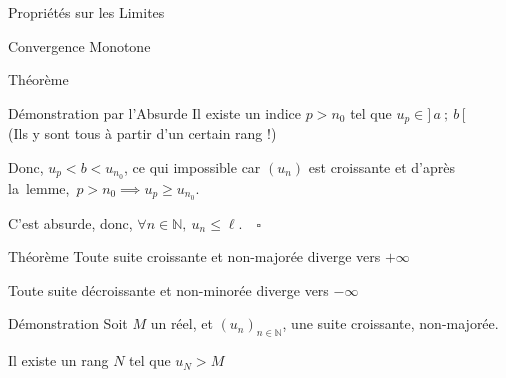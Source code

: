 \documentclass{coursbook}
\begin{document}
\begin{Gpartie}{Propriétés sur les Limites}
\begin{Spartie}{Convergence Monotone}
\begin{SSpartie}{Théorème}
\begin{SSSpartie}{Démonstration par l'Absurde}
                    Il existe un indice $p>n_0$ tel que $u_p\in\big]\,a~;~b\,\big[$ \\ (Ils y sont tous à partir d'un certain rang !)

                    Donc, $u_p<b<u_{n_0}$, ce qui impossible car $(u_n)$ est croissante et d'après la~lemme,~$p>n_0\implies u_p\geq u_{n_0}$.

                    C'est absurde, donc, $\forall n\in\mathbb{N},~u_n\leq\ell$.$\quad\square$
                \end{SSSpartie}
            \end{SSpartie}
            \begin{SSpartie}{Théorème} 
                Toute suite croissante et non-majorée diverge vers $+\infty$

                Toute suite décroissante et non-minorée diverge vers $-\infty$

                \begin{SSSpartie}{Démonstration} 
                    Soit $M$ un réel, et $(u_n)_{n\in\mathbb{N}}$, une suite croissante, non-majorée.

                    Il existe un rang $N$ tel que $u_N>M$


\end{SSSpartie}
\end{SSpartie}
\end{Spartie}
\end{Gpartie}
\end{document}
